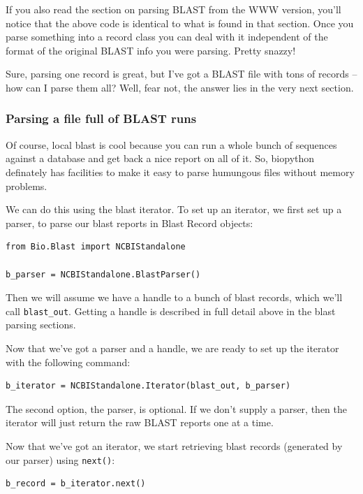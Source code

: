 \documentclass{article}
\begin{document}
If you also read the section on parsing BLAST from the WWW version, you'll notice that the above code is identical to what is found in that section. Once you parse something into a record class you can deal with it independent of the format of the original BLAST info you were parsing. Pretty snazzy!


Sure, parsing one record is great, but I've got a BLAST file with tons of records -- how can I parse them all? Well, fear not, the answer lies in the very next section.

\subsubsection{Parsing a file full of BLAST runs}

Of course, local blast is cool because you can run a whole bunch of sequences against a database and get back a nice report on all of it. So, biopython definately has facilities to make it easy to parse humungous files without memory problems. 


We can do this using the blast iterator. To set up an iterator, we first set up a parser, to parse our blast reports in Blast Record objects:

\begin{verbatim}
from Bio.Blast import NCBIStandalone

b_parser = NCBIStandalone.BlastParser()
\end{verbatim}

Then we will assume we have a handle to a bunch of blast records, which we'll call \verb|blast_out|. Getting a handle is described in full detail above in the blast parsing sections. 


Now that we've got a parser and a handle, we are ready to set up the iterator with the following command:

\begin{verbatim}
b_iterator = NCBIStandalone.Iterator(blast_out, b_parser)
\end{verbatim}

The second option, the parser, is optional. If we don't supply a parser, then the iterator will just return the raw BLAST reports one at a time.


Now that we've got an iterator, we start retrieving blast records (generated by our parser) using \verb|next()|:

\begin{verbatim}
b_record = b_iterator.next()
\end{verbatim}
\end{document}
